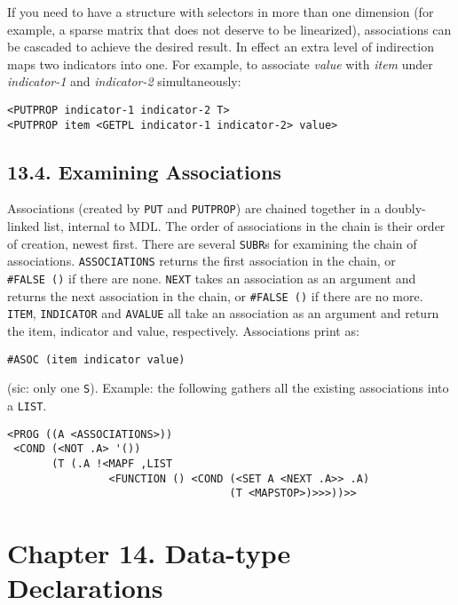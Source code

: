 \documentclass[a4paper,]{article}
\begin{document}
If you need to have a structure with selectors in more than one dimension (for example, a sparse matrix that does not
deserve to be linearized), associations can be cascaded to achieve the desired result. In effect an extra level of
indirection maps two indicators into one. For example, to associate \emph{value} with \emph{item} under \emph{indicator-1}
and \emph{indicator-2} simultaneously:

\begin{verbatim}
<PUTPROP indicator-1 indicator-2 T>
<PUTPROP item <GETPL indicator-1 indicator-2> value>
\end{verbatim}

\subsection{13.4. Examining Associations}\label{examining-associations}

Associations (created by \texttt{PUT} and \texttt{PUTPROP}) are chained together in a doubly-linked list, internal to MDL.
The order of associations in the chain is their order of creation, newest first. There are several \texttt{SUBR}s for
examining the chain of associations. \texttt{ASSOCIATIONS}  returns the first
association in the chain, or \texttt{\#FALSE\ ()} if there are none. \texttt{NEXT}  takes an
association as an argument and returns the next association in the chain, or \texttt{\#FALSE\ ()} if there are no more.
\texttt{ITEM}, \texttt{INDICATOR}  and \texttt{AVALUE}
 all take an association as an argument and return the item, indicator and value,
respectively. Associations print as:

\begin{verbatim}
#ASOC (item indicator value)
\end{verbatim}

(sic: only one \texttt{S}). Example: the following gathers all the existing associations into a
\texttt{LIST}.

\begin{verbatim}
<PROG ((A <ASSOCIATIONS>))
 <COND (<NOT .A> '())
       (T (.A !<MAPF ,LIST
                <FUNCTION () <COND (<SET A <NEXT .A>> .A)
                                   (T <MAPSTOP>)>>>))>>
\end{verbatim}

\section{Chapter 14. Data-type Declarations}\label{chapter-14.-data-type-declarations}
\end{document}

